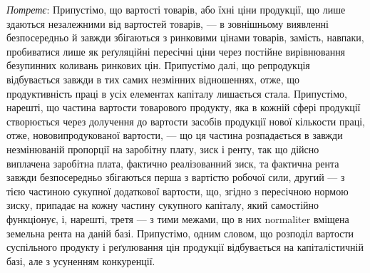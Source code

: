 \emph{Потретє}: Припустімо, що вартості товарів, або їхні ціни продукції, що
лише здаються незалежними від вартостей товарів, — в зовнішньому виявленні
безпосередньо й завжди збігаються з ринковими цінами товарів, замість, навпаки,
пробиватися лише як реґуляційні пересічні ціни через постійне вирівнювання
безупинних коливань ринкових цін. Припустімо далі, що репродукція відбувається
завжди в тих самих незмінних відношеннях, отже, що продуктивність праці в усіх
елементах капіталу лишається стала. Припустімо, нарешті, що частина вартости
товарового продукту, яка в кожній сфері продукції створюється через долучення
до вартости засобів продукції нової кількости праці, отже, нововипродукованої
вартости, — що ця частина розпадається в завжди незмінюваній пропорції на заробітну
плату, зиск і ренту, так що дійсно виплачена заробітна плата, фактично
реалізованний зиск, та фактична рента завжди безпосередньо збігаються перша
з вартістю робочої сили, другий — з тією частиною сукупної додаткової вартости,
що, згідно з пересічною нормою зиску, припадає на кожну частину сукупного
капіталу, який самостійно функціонує, і, нарешті, третя — з тими межами, що в
них normaliter вміщена земельна рента на даній базі. Припустімо, одним словом,
що розподіл вартости суспільного продукту і реґулювання цін продукції відбувається
на капіталістичній базі, але з усуненням конкуренції.
